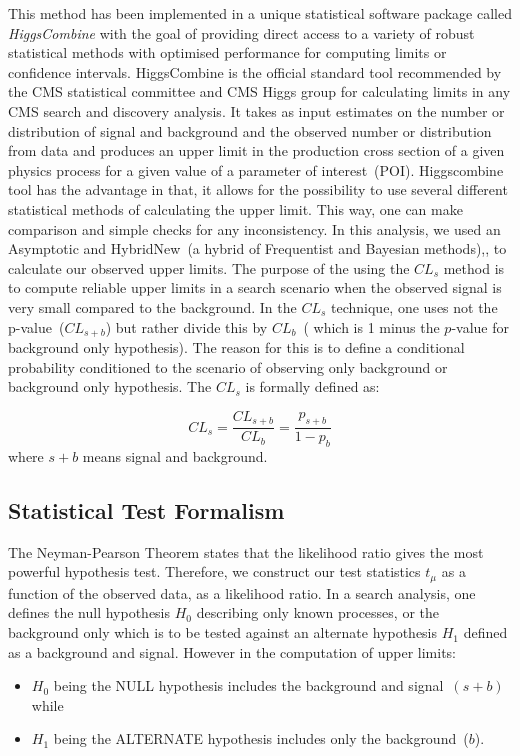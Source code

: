This method has been implemented in a unique statistical software package called \textit{HiggsCombine} with the goal of providing direct access to a variety of robust statistical methods with optimised performance for computing limits or confidence intervals.
HiggsCombine \cite{LIMITS} is the official standard tool recommended by the CMS statistical committee and CMS Higgs group for calculating limits in any CMS search and discovery analysis.
It takes as input estimates on the number or distribution of signal and background and the observed number or distribution from data and produces an upper limit in the production cross section of a given physics process for a given value of a parameter of interest~(POI).
Higgscombine tool has the advantage in that, it allows for the possibility to use several different statistical methods of calculating the upper limit. This way, one can make comparison and simple checks for any inconsistency. In this analysis, we used an Asymptotic \cite{ASYMP} and HybridNew~(a hybrid of Frequentist and Bayesian methods),\cite{LIMITS}, to calculate our observed upper limits. 
The purpose of the using the $CL_{s}$ method is to compute reliable upper limits in a search scenario when
the observed signal is very small compared to the background.
In the $CL_{s}$ technique, one uses not the p-value~($CL_{s+b}$) but rather divide this by $CL_{b}$~( which is 1 minus the $p$-value for background only hypothesis). The reason for this is to define a conditional probability conditioned to the scenario of observing only background or background only hypothesis. The $CL_{s}$ is formally defined  as:

\begin{equation}
CL_{s}  =  \frac{CL_{s+b}}{CL_{b}}  = \frac{p_{s+b}}{1 - p_{b}}
\end{equation}
where $s+b$ means signal and background.

\subsection{Statistical Test Formalism}
The Neyman-Pearson Theorem states that the likelihood ratio gives the most powerful hypothesis test. Therefore, we construct our test statistics $t_\mu$ as a function of the observed data, as a likelihood ratio.
In a search analysis, one defines the null hypothesis $H_{0}$ describing only known processes, or the background only which is to be tested against an alternate hypothesis $H_{1}$ defined as a background  and signal. However in the computation of upper limits:
\begin{itemize}
\item $H_{0}$ being the NULL hypothesis includes the background and signal~$(s + b)$ while
\item $H_{1}$ being the ALTERNATE hypothesis includes only the  background~($b$). 
\end{itemize}

